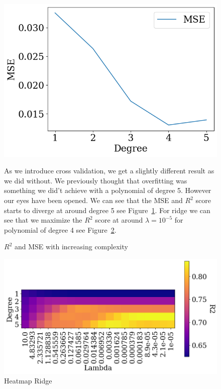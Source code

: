 \documentclass[twoside,11pt]{report}
\begin{document}
\begin{figure}[h]
    \begin{minipage}[!t]{.48\linewidth}
    \begin{center}
        \includegraphics[width=1.0\textwidth]{../runsAndAdditions/R2andMSEOLSCrossval.png}
        \caption{$R^2$ and MSE with increasing complexity}\label{fig:R2andMSEOLSCrossval}
    \end{center}
\end{minipage}
\hspace{4mm}
\begin{minipage}[!t]{.48\linewidth}
    As we introduce cross validation, we get a slightly different result as we did without.
We previously thought that overfitting was something we did't achieve with a polynomial of degree 5. However
our eyes have been opened. We can see that the MSE and $R^2$ score starts to diverge at around degree 5 see Figure~\ref{fig:R2andMSEOLSCrossval}.
For ridge we can see that we maximize the $R^2$ score at around $\lambda = 10^{-5}$ for polynomial of degree 4 see Figure~\ref{fig:heatmapCrossval}.

\end{minipage}
\end{figure}

\begin{figure}[!h]
    \begin{center}
        \includegraphics[width=1.0\textwidth]{../runsAndAdditions/heatmapCrossval.png}
    \end{center}
    \caption{Heatmap Ridge}\label{fig:heatmapCrossval}
\end{figure}
\end{document}
